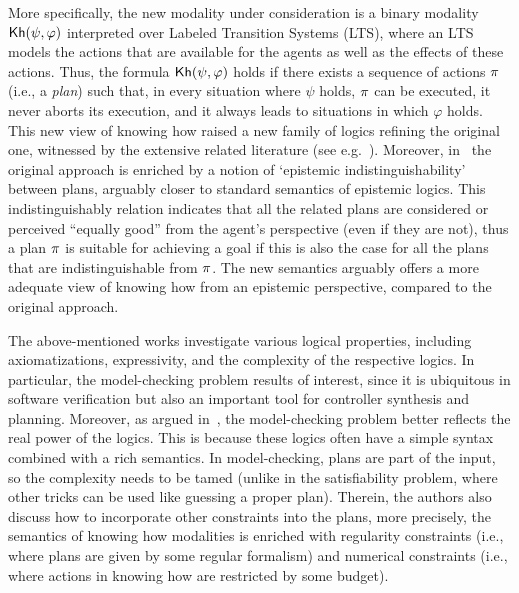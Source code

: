More specifically, the new modality under consideration is a binary modality ${\mathsf{Kh}}(\psi,\varphi)$ interpreted over Labeled Transition Systems (LTS), where an LTS models the  actions that are available for the agents as well as the effects of these actions. Thus,  the formula ${\mathsf{Kh}}(\psi,\varphi)$ holds if there exists a sequence of actions $\pi$ (i.e., a \emph{plan}) such that,  in every situation where $\psi$ holds, $\pi$ can be executed, it never aborts its execution, and it always leads to situations in which $\varphi$ holds. This new view of knowing how raised a new family of logics refining the original one, witnessed by the extensive related literature (see e.g.~\cite{LiWang17,Li17,FervariHLW17,NaumovT19,Naumov2018a}). Moreover, in~\cite{AFSVQ21,AFSVQ23} the original approach is enriched by a notion of `epistemic indistinguishability' between plans, arguably closer to standard semantics of epistemic logics. This indistinguishably relation indicates that all the related plans are considered or perceived ``equally good''
from the agent's perspective (even if they are not), thus a plan $\pi$ is suitable for achieving a goal if this is also the case for all the plans that are indistinguishable from $\pi$. The new semantics arguably offers a more adequate view of knowing how from an epistemic perspective, compared to the original approach.

The above-mentioned works investigate various logical properties, including axiomatizations, expressivity, and the complexity of the respective logics. In particular, the model-checking problem results of interest, since it is  ubiquitous in software verification but also an important tool for controller synthesis and planning. Moreover, as argued in~\cite{DF23}, the model-checking problem better reflects the real power of the logics. This is because these logics often have a simple syntax combined with a rich semantics. In model-checking, plans are part of the input, so the complexity needs to be tamed (unlike in the satisfiability problem, where other tricks can be used like guessing a proper plan). Therein,  the authors also discuss how to incorporate other constraints into the plans, more precisely, the semantics of knowing how modalities is enriched with regularity constraints (i.e., where plans are given by some regular formalism) and numerical constraints (i.e., where actions in knowing how are restricted by some budget). 

